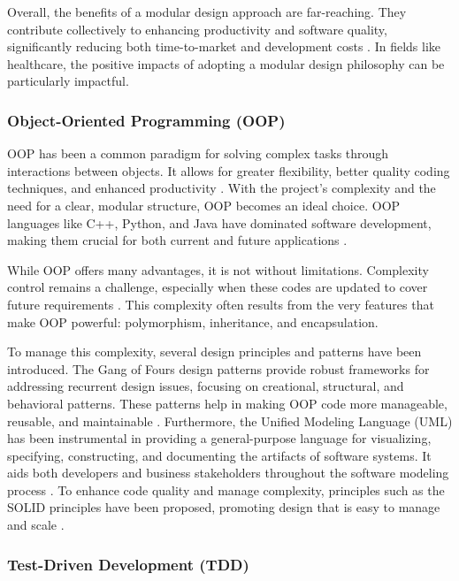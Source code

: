 Overall, the benefits of a modular design approach are far-reaching.
They contribute collectively to enhancing productivity and software
quality, significantly reducing both time-to-market and development
costs \cite{19}. In fields
like healthcare, the positive impacts of adopting a modular design
philosophy can be particularly impactful.

\subsubsection{Object-Oriented Programming
(OOP)}\label{object-oriented-programming-oop}

OOP has been a common paradigm for solving complex tasks through
interactions between objects. It allows for greater flexibility, better
quality coding techniques, and enhanced productivity
\cite{21}\cite{22}. With the
project's complexity and the need for a clear, modular structure, OOP
becomes an ideal choice. OOP languages like C++, Python, and Java have
dominated software development, making them crucial for both current and
future applications
\cite{23}\cite{24}.

While OOP offers many advantages, it is not without limitations.
Complexity control remains a challenge, especially when these codes are
updated to cover future requirements
\cite{21}\cite{25}. This
complexity often results from the very features that make OOP powerful:
polymorphism, inheritance, and encapsulation.

To manage this complexity, several design principles and patterns have
been introduced. The Gang of Four\textquotesingle s design patterns
provide robust frameworks for addressing recurrent design issues,
focusing on creational, structural, and behavioral patterns. These
patterns help in making OOP code more manageable, reusable, and
maintainable \cite{26}.
Furthermore, the Unified Modeling Language (UML) has been instrumental
in providing a general-purpose language for visualizing, specifying,
constructing, and documenting the artifacts of software systems. It aids
both developers and business stakeholders throughout the software
modeling process \cite{27}.
To enhance code quality and manage complexity, principles such as the
SOLID principles have been proposed, promoting design that is easy to
manage and scale
\cite{24}\cite{28}.

\subsubsection{Test-Driven Development
(TDD)}\label{test-driven-development-tdd}

